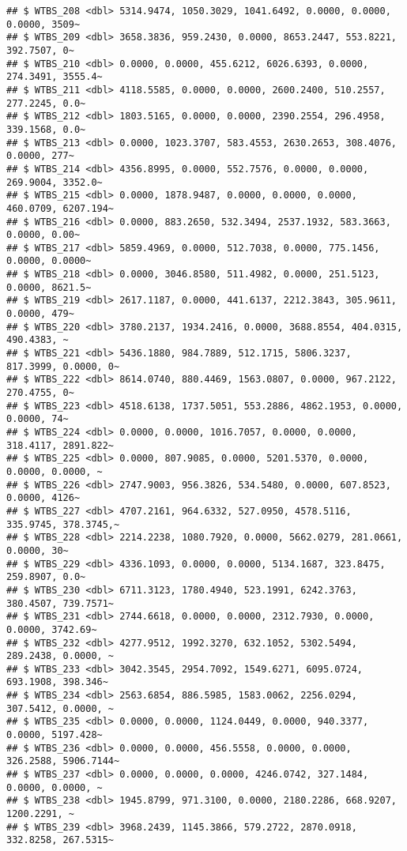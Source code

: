 \documentclass[
]{article}
\begin{document}
\begin{verbatim}
## $ WTBS_208 <dbl> 5314.9474, 1050.3029, 1041.6492, 0.0000, 0.0000, 0.0000, 3509~
## $ WTBS_209 <dbl> 3658.3836, 959.2430, 0.0000, 8653.2447, 553.8221, 392.7507, 0~
## $ WTBS_210 <dbl> 0.0000, 0.0000, 455.6212, 6026.6393, 0.0000, 274.3491, 3555.4~
## $ WTBS_211 <dbl> 4118.5585, 0.0000, 0.0000, 2600.2400, 510.2557, 277.2245, 0.0~
## $ WTBS_212 <dbl> 1803.5165, 0.0000, 0.0000, 2390.2554, 296.4958, 339.1568, 0.0~
## $ WTBS_213 <dbl> 0.0000, 1023.3707, 583.4553, 2630.2653, 308.4076, 0.0000, 277~
## $ WTBS_214 <dbl> 4356.8995, 0.0000, 552.7576, 0.0000, 0.0000, 269.9004, 3352.0~
## $ WTBS_215 <dbl> 0.0000, 1878.9487, 0.0000, 0.0000, 0.0000, 460.0709, 6207.194~
## $ WTBS_216 <dbl> 0.0000, 883.2650, 532.3494, 2537.1932, 583.3663, 0.0000, 0.00~
## $ WTBS_217 <dbl> 5859.4969, 0.0000, 512.7038, 0.0000, 775.1456, 0.0000, 0.0000~
## $ WTBS_218 <dbl> 0.0000, 3046.8580, 511.4982, 0.0000, 251.5123, 0.0000, 8621.5~
## $ WTBS_219 <dbl> 2617.1187, 0.0000, 441.6137, 2212.3843, 305.9611, 0.0000, 479~
## $ WTBS_220 <dbl> 3780.2137, 1934.2416, 0.0000, 3688.8554, 404.0315, 490.4383, ~
## $ WTBS_221 <dbl> 5436.1880, 984.7889, 512.1715, 5806.3237, 817.3999, 0.0000, 0~
## $ WTBS_222 <dbl> 8614.0740, 880.4469, 1563.0807, 0.0000, 967.2122, 270.4755, 0~
## $ WTBS_223 <dbl> 4518.6138, 1737.5051, 553.2886, 4862.1953, 0.0000, 0.0000, 74~
## $ WTBS_224 <dbl> 0.0000, 0.0000, 1016.7057, 0.0000, 0.0000, 318.4117, 2891.822~
## $ WTBS_225 <dbl> 0.0000, 807.9085, 0.0000, 5201.5370, 0.0000, 0.0000, 0.0000, ~
## $ WTBS_226 <dbl> 2747.9003, 956.3826, 534.5480, 0.0000, 607.8523, 0.0000, 4126~
## $ WTBS_227 <dbl> 4707.2161, 964.6332, 527.0950, 4578.5116, 335.9745, 378.3745,~
## $ WTBS_228 <dbl> 2214.2238, 1080.7920, 0.0000, 5662.0279, 281.0661, 0.0000, 30~
## $ WTBS_229 <dbl> 4336.1093, 0.0000, 0.0000, 5134.1687, 323.8475, 259.8907, 0.0~
## $ WTBS_230 <dbl> 6711.3123, 1780.4940, 523.1991, 6242.3763, 380.4507, 739.7571~
## $ WTBS_231 <dbl> 2744.6618, 0.0000, 0.0000, 2312.7930, 0.0000, 0.0000, 3742.69~
## $ WTBS_232 <dbl> 4277.9512, 1992.3270, 632.1052, 5302.5494, 289.2438, 0.0000, ~
## $ WTBS_233 <dbl> 3042.3545, 2954.7092, 1549.6271, 6095.0724, 693.1908, 398.346~
## $ WTBS_234 <dbl> 2563.6854, 886.5985, 1583.0062, 2256.0294, 307.5412, 0.0000, ~
## $ WTBS_235 <dbl> 0.0000, 0.0000, 1124.0449, 0.0000, 940.3377, 0.0000, 5197.428~
## $ WTBS_236 <dbl> 0.0000, 0.0000, 456.5558, 0.0000, 0.0000, 326.2588, 5906.7144~
## $ WTBS_237 <dbl> 0.0000, 0.0000, 0.0000, 4246.0742, 327.1484, 0.0000, 0.0000, ~
## $ WTBS_238 <dbl> 1945.8799, 971.3100, 0.0000, 2180.2286, 668.9207, 1200.2291, ~
## $ WTBS_239 <dbl> 3968.2439, 1145.3866, 579.2722, 2870.0918, 332.8258, 267.5315~

\end{verbatim}
\end{document}
